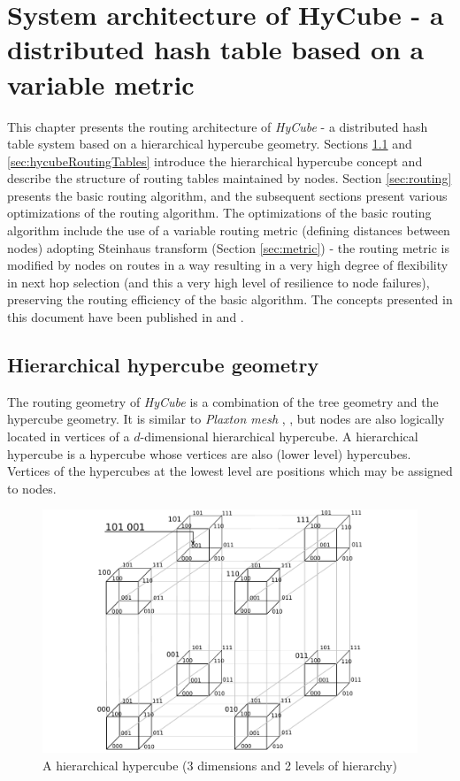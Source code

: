 
\chapter{System architecture of HyCube - a distributed hash table based on a variable metric}
\label{sec:hycubeArchitecture}

This chapter presents the routing architecture of \emph{HyCube} - a distributed hash table system based on a hierarchical hypercube geometry. Sections \ref{sec:hycubeHierarchicalHypercube} and \ref{sec:hycubeRoutingTables} introduce the hierarchical hypercube concept and describe the structure of routing tables maintained by nodes. Section \ref{sec:routing} presents the basic routing algorithm, and the subsequent sections present various optimizations of the routing algorithm. The optimizations of the basic routing algorithm include the use of a variable routing metric (defining distances between nodes) adopting Steinhaus transform (Section \ref{sec:metric}) - the routing metric is modified by nodes on routes in a way resulting in a very high degree of flexibility in next hop selection (and this a very high level of resilience to node failures), preserving the routing efficiency of the basic algorithm. The concepts presented in this document have been published in \cite{hycubePpam2009} and \cite{hycubeICSReportFeb2013}.





\section{Hierarchical hypercube geometry}
\label{sec:hycubeHierarchicalHypercube}

The routing geometry of \emph{HyCube} is a combination of the tree geometry and the hypercube geometry. It is similar to \emph{Plaxton mesh} \cite{plaxton1}, \cite{plaxton2}, but nodes are also logically located in vertices of a $d$-dimensional hierarchical hypercube. A hierarchical hypercube is a hypercube whose vertices are also (lower level) hypercubes. Vertices of the hypercubes at the lowest level are positions which may be assigned to nodes. 

\begin{figure}
\centering
\includegraphics[scale=.6]{img/hh.pdf}
\caption{A hierarchical hypercube (3 dimensions and 2 levels of hierarchy)}
\label{fig:hierarchicalHypercube}
\end{figure}

